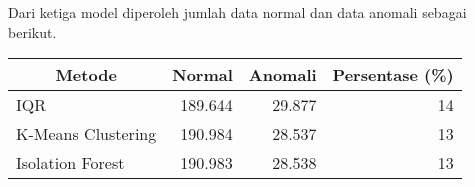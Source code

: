     Dari ketiga model diperoleh jumlah data normal dan data anomali sebagai berikut.

    \begin{table}[h]
        \centering
        \begin{tabular}{|l|r|r|r|}
            \hline
            \multicolumn{1}{|c|}{\textbf{Metode}} & \multicolumn{1}{c|}{\textbf{Normal}} & \multicolumn{1}{c|}{\textbf{Anomali}} & \multicolumn{1}{c|}{\textbf{Persentase (\%)}} \\ \hline
            IQR                & 189.644 & 29.877 & 14 \\ \hline
            K-Means Clustering & 190.984 & 28.537 & 13 \\ \hline
            Isolation Forest   & 190.983 & 28.538 & 13 \\ \hline
        \end{tabular}
    \end{table}